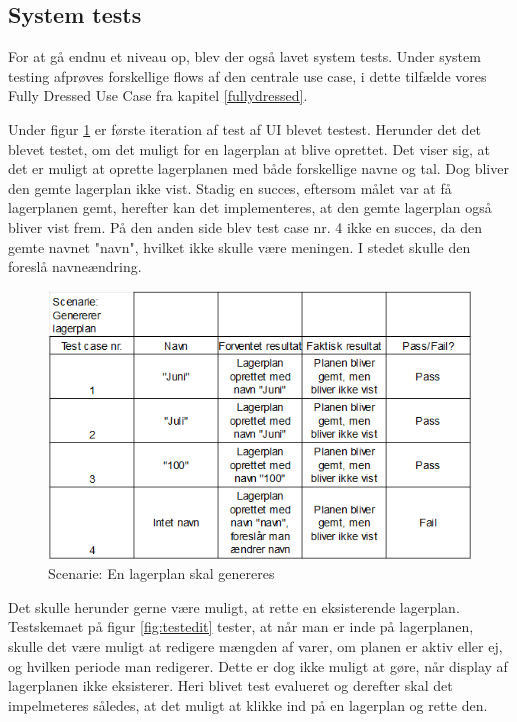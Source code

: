 \subsection{System tests}
For at gå endnu et niveau op, blev der også lavet system tests\cite{TestLevels}. Under system testing afprøves forskellige flows af den centrale use case, i dette tilfælde vores Fully Dressed Use Case fra kapitel \ref{fullydressed}.

Under figur \ref{fig:testgenerate} er første iteration af test af UI blevet testest. Herunder det det blevet testet, om det muligt for en lagerplan at blive oprettet. Det viser sig, at det er muligt at oprette lagerplanen med både forskellige navne og tal. Dog bliver den gemte lagerplan ikke vist. Stadig en succes, eftersom målet var at få lagerplanen gemt, herefter kan det implementeres, at den gemte lagerplan også bliver vist frem. På den anden side blev test case nr. 4 ikke en succes, da den gemte navnet "navn", hvilket ikke skulle være meningen. I stedet skulle den foreslå navneændring.

\begin{figure}[p]
    \centering
    \includegraphics[width=0.7\hsize]{figures/tests/test_generer_plan.png}
    \caption{Scenarie: En lagerplan skal genereres}
    \label{fig:testgenerate}
\end{figure}

Det skulle herunder gerne være muligt, at rette en eksisterende lagerplan. Testskemaet på figur \ref{fig:testedit} tester, at når man er inde på lagerplanen, skulle det være muligt at redigere mængden af varer, om planen er aktiv eller ej, og hvilken periode man redigerer.  Dette er dog ikke muligt at gøre, når display af lagerplanen ikke eksisterer. Heri blivet test evalueret og derefter skal det impelmeteres således, at det muligt at klikke ind på en lagerplan og rette den. 


